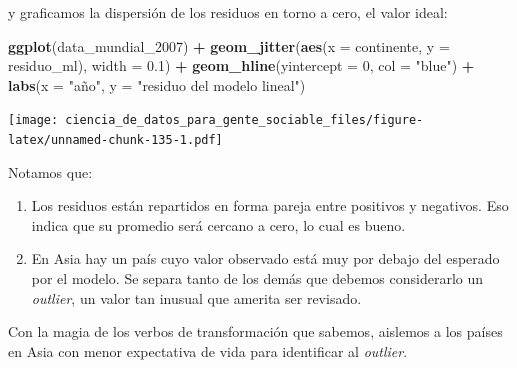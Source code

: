 \documentclass[spanish,]{book}
\newenvironment{Shaded}{\begin{snugshade}}{\end{snugshade}}
\newcommand{\DataTypeTok}[1]{\textcolor[rgb]{0.13,0.29,0.53}{#1}}
\newcommand{\DecValTok}[1]{\textcolor[rgb]{0.00,0.00,0.81}{#1}}
\newcommand{\FloatTok}[1]{\textcolor[rgb]{0.00,0.00,0.81}{#1}}
\newcommand{\KeywordTok}[1]{\textcolor[rgb]{0.13,0.29,0.53}{\textbf{#1}}}
\newcommand{\NormalTok}[1]{#1}
\newcommand{\OperatorTok}[1]{\textcolor[rgb]{0.81,0.36,0.00}{\textbf{#1}}}
\newcommand{\StringTok}[1]{\textcolor[rgb]{0.31,0.60,0.02}{#1}}
\providecommand{\tightlist}{%
  \setlength{\itemsep}{0pt}\setlength{\parskip}{0pt}}
\begin{document}
y graficamos la dispersión de los residuos en torno a cero, el valor ideal:

\begin{Shaded}
\begin{Highlighting}[]
\KeywordTok{ggplot}\NormalTok{(data_mundial_}\DecValTok{2007}\NormalTok{) }\OperatorTok{+}
\StringTok{    }\KeywordTok{geom_jitter}\NormalTok{(}\KeywordTok{aes}\NormalTok{(}\DataTypeTok{x =}\NormalTok{ continente, }\DataTypeTok{y =}\NormalTok{ residuo_ml), }\DataTypeTok{width =} \FloatTok{0.1}\NormalTok{) }\OperatorTok{+}
\StringTok{    }\KeywordTok{geom_hline}\NormalTok{(}\DataTypeTok{yintercept =} \DecValTok{0}\NormalTok{, }\DataTypeTok{col =} \StringTok{"blue"}\NormalTok{) }\OperatorTok{+}
\StringTok{    }\KeywordTok{labs}\NormalTok{(}\DataTypeTok{x =} \StringTok{"año"}\NormalTok{, }\DataTypeTok{y =} \StringTok{"residuo del modelo lineal"}\NormalTok{)}
\end{Highlighting}
\end{Shaded}

\texttt{[image: ciencia\_de\_datos\_para\_gente\_sociable\_files/figure-latex/unnamed-chunk-135-1.pdf]}

Notamos que:

\begin{enumerate}
\def\labelenumi{\arabic{enumi}.}
\tightlist
\item
  Los residuos están repartidos en forma pareja entre positivos y negativos. Eso indica que su promedio será cercano a cero, lo cual es bueno.
\item
  En Asia hay un país cuyo valor observado está muy por debajo del esperado por el modelo. Se separa tanto de los demás que debemos considerarlo un \emph{outlier}, un valor tan inusual que amerita ser revisado.
\end{enumerate}

Con la magia de los verbos de transformación que sabemos, aislemos a los países en Asia con menor expectativa de vida para identificar al \emph{outlier}.

\begin{Shaded}
\end{Shaded}
\end{document}
